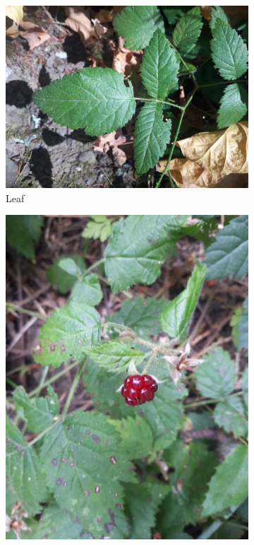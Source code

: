 \begin{figure}
\centering
\begin{subfigure}{0.47\textwidth}
    \includegraphics[width=\textwidth]{rubus/ursinus_leaf_01}
    \caption{Leaf}
    \label{fig:rub:ursinus:leaf}
\end{subfigure}
\hfill
\begin{subfigure}{0.47\textwidth}
    \includegraphics[width=\textwidth]{rubus/ursinus_berry_01}

\end{subfigure}
\end{figure}
